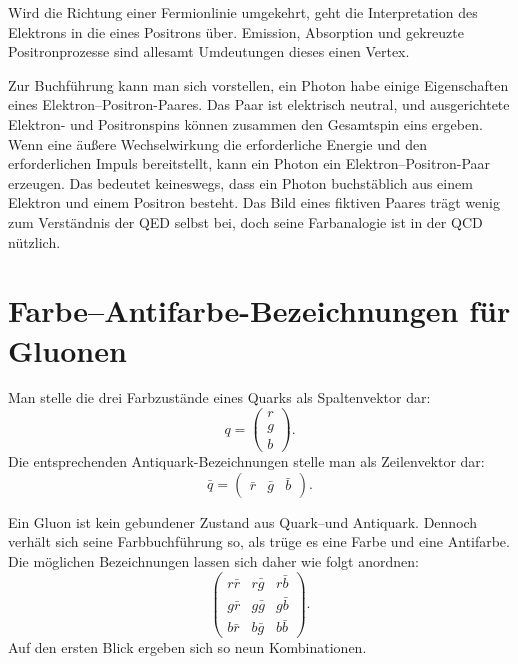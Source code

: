Wird die Richtung einer Fermionlinie umgekehrt, geht die Interpretation des Elektrons in die eines Positrons über. Emission, Absorption und gekreuzte Positronprozesse sind allesamt Umdeutungen dieses einen Vertex.

Zur Buchführung kann man sich vorstellen, ein Photon habe einige Eigenschaften eines Elektron--Positron-Paares. Das Paar ist elektrisch neutral, und ausgerichtete Elektron- und Positronspins können zusammen den Gesamtspin eins ergeben. Wenn eine äußere Wechselwirkung die erforderliche Energie und den erforderlichen Impuls bereitstellt, kann ein Photon ein Elektron--Positron-Paar erzeugen. Das bedeutet keineswegs, dass ein Photon buchstäblich aus einem Elektron und einem Positron besteht. Das Bild eines fiktiven Paares trägt wenig zum Verständnis der QED selbst bei, doch seine Farbanalogie ist in der QCD nützlich.

\section{Farbe--Antifarbe-Bezeichnungen für Gluonen}

Man stelle die drei Farbzustände eines Quarks als Spaltenvektor dar:
\begin{equation}
q=
\begin{pmatrix}
r\\
g\\
b
\end{pmatrix}.
\end{equation}
Die entsprechenden Antiquark-Bezeichnungen stelle man als Zeilenvektor dar:
\begin{equation}
\bar q=
\begin{pmatrix}
\bar r&\bar g&\bar b
\end{pmatrix}.
\end{equation}

Ein Gluon ist kein gebundener Zustand aus Quark--und Antiquark. Dennoch verhält sich seine Farbbuchführung so, als trüge es eine Farbe und eine Antifarbe. Die möglichen Bezeichnungen lassen sich daher wie folgt anordnen:
\begin{equation}
\begin{pmatrix}
r\bar r&r\bar g&r\bar b\\
g\bar r&g\bar g&g\bar b\\
b\bar r&b\bar g&b\bar b
\end{pmatrix}.
\end{equation}
Auf den ersten Blick ergeben sich so neun Kombinationen.

